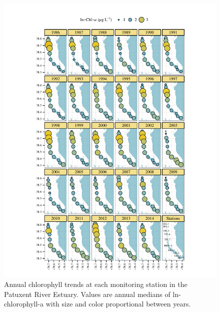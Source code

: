 \documentclass[letterpaper,12pt,oneside]{article}\usepackage[]{graphicx}\usepackage[]{color}
\makeatletter
\def\maxwidth{ %
  \ifdim\Gin@nat@width>\linewidth
    \linewidth
  \else
    \Gin@nat@width
  \fi
}
\makeatother
\begin{document}
\begin{figure}[!ht]

{\centering \includegraphics[width=\maxwidth]{figs/chlyr-1} 

}

\caption[Annual chlorophyll trends at each monitoring station in the Patuxent River Estuary]{Annual chlorophyll trends at each monitoring station in the Patuxent River Estuary.  Values are annual medians of ln-chlorophyll-a with size and color proportional between years.}\label{fig:chlyr}
\end{figure}
\end{document}
